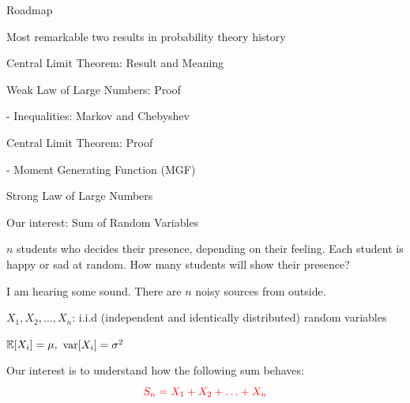 \documentclass[fleqn,aspectratio=169]{beamer}
\begin{document}
\begin{frame}{Roadmap}

\plitemsep 0.1in

\bci 
\item Most remarkable two results in probability theory history

\bigskip

\item {}
\item Central Limit Theorem: Result and Meaning
\item Weak Law of Large Numbers: Proof

- Inequalities: Markov and Chebyshev

\item Central Limit Theorem: Proof

- Moment Generating Function (MGF)

\item Strong Law of Large Numbers
\eci 

\end{frame}

\begin{frame}{Our interest: Sum of Random Variables}

\plitemsep 0.1in

\bci 

\item<1->  $n$ students who decides their presence, depending on their feeling. Each student is happy or sad at random. How many students will show their presence?

\item<2->  I am hearing some sound. There are $n$ noisy sources from outside. 

\bigskip

\item<3-> $X_1, X_2, \ldots, X_n$: i.i.d (independent and identically distributed) random variables

\item<4-> $\mathbb{E}[ X_i ] = \mu,$ $\text{var}[ X_i ] = \sigma^2$ 

\item<5-> Our interest is to understand how the following sum behaves:
$$
{\color{red} S_n = X_1 + X_2 + \ldots + X_n}
$$

\eci 

\end{frame}
\end{document}
